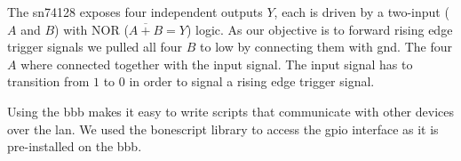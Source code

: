 The \gls{sn74128} exposes four independent outputs $Y$, each is driven by a
two-input ($A$ and $B$) with NOR ($\overline{A+B}=Y$) logic. As our objective
is to forward rising edge trigger signals we pulled all four $B$ to low by
connecting them with \gls{gnd}. The four $A$ where connected together with
the input signal. The input signal has to transition from $1$ to $0$ in order
to signal a rising edge trigger signal.
Using the \gls{bbb} makes it easy to write scripts that communicate with
other devices over the \gls{lan}. We used the bonescript library to access
the \gls{gpio} interface as it is pre-installed on the \gls{bbb}.
